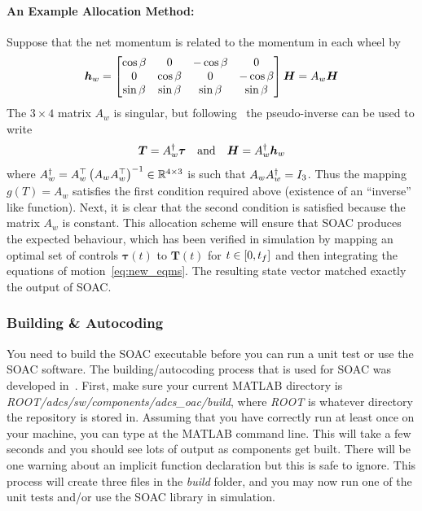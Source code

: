 \documentclass[10pt]{article}
\begin{document}
\paragraph{An Example Allocation Method:} Suppose that the net momentum is related to the momentum in each wheel by
\begin{equation}
\bm{h}_w = \begin{bmatrix}
\cos\beta & 0 & -\cos\beta & 0 \\ 0 & \cos\beta & 0 & -\cos\beta \\ \sin\beta & \sin\beta & \sin\beta & \sin\beta
\end{bmatrix} \bm{H} = A_w \bm{H}
\end{equation}
The $3\times 4$ matrix $A_w$ is singular, but following~\cite[\S 7.3.4]{Sidi1997} the pseudo-inverse can be used to write 
\begin{equation}
\bm{T} = A_w^{\dagger} \bm{\tau} \quad \text{and} \quad \bm{H} = A_w^{\dagger} \bm{h}_w
\end{equation}
where $A_w^{\dagger} = A_w^{\top} \left(A_w A_w^{\top}\right)^{-1} \in {\mathbb{R}}^{4\times 3}$
is such that $A_w A_w^{\dagger} = I_{3}$. Thus the mapping $g(T) = A_w$ satisfies the first condition required above (existence of an ``inverse'' like function). Next, it is clear that the second condition is satisfied because the matrix $A_w$ is constant. This allocation scheme will ensure that SOAC produces the expected behaviour, which has been verified in simulation by mapping an optimal set of controls $\bm{\tau}(t)$ to $\bm{T}(t)$ for $t\in[0,t_f]$ and then integrating the equations of motion~\eqref{eq:new_eqms}. The resulting state vector matched exactly the output of SOAC.

\subsubsection{Building \& Autocoding}\label{sec2:build_autocode}

You need to build the SOAC executable before you can run a unit test or use the SOAC software. The building/autocoding process that is used for SOAC was developed in~\cite{MalyutaThesis}. First, make sure your current MATLAB directory is \textit{ROOT/adcs/sw/components/adcs\_oac/build}, where \textit{ROOT} is whatever directory the repository is stored in. Assuming that you have correctly run  at least once on your machine, you can type  at the MATLAB command line. This will take a few seconds and you should see lots of output as components get built. There will be one warning about an implicit function declaration but this is safe to ignore. This process will create three files in the \textit{build} folder, and you may now run one of the unit tests and/or use the SOAC library in simulation.  
\end{document}
